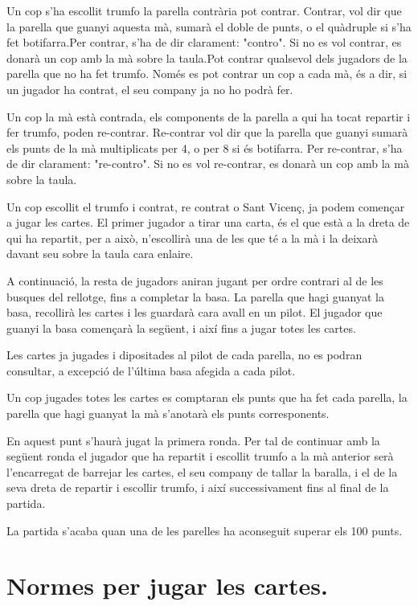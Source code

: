 Un cop s'ha escollit trumfo la parella contrària pot contrar. Contrar, vol dir que la parella que guanyi aquesta mà, sumarà el doble de punts, o el quàdruple si s'ha fet botifarra.Per contrar, s'ha de dir clarament: "contro". Si no es vol contrar, es donarà un cop amb la mà sobre la taula.Pot contrar qualsevol dels jugadors de la parella que no ha fet trumfo. Només es pot contrar un cop a cada mà, és a dir, si un jugador ha contrat, el seu company ja no ho podrà fer.

Un cop la mà està contrada, els components de la parella a qui ha tocat repartir i fer trumfo, poden re-contrar. Re-contrar vol dir que la parella que guanyi sumarà els punts de la mà multiplicats per 4, o per 8 si és botifarra. Per re-contrar, s'ha de dir clarament: "re-contro". Si no es vol re-contrar, es donarà un cop amb la mà sobre la taula.


Un cop escollit el trumfo i contrat, re contrat o Sant Vicenç, ja podem començar a jugar les cartes. El primer jugador a tirar una carta, és el que està a la dreta de qui ha repartit, per a això, n'escollirà una de les que té a la mà i la deixarà davant seu sobre la taula cara enlaire.

A continuació, la resta de jugadors aniran jugant per ordre contrari al de les busques del rellotge, fins a completar la basa. La parella que hagi guanyat la basa, recollirà les cartes i les guardarà cara avall en un pilot. El jugador que guanyi la basa començarà la següent, i així fins a jugar totes les cartes.

Les cartes ja jugades i dipositades al pilot de cada parella, no es podran consultar, a excepció de l'última basa afegida a cada pilot.

Un cop jugades totes les cartes es comptaran els punts que ha fet cada parella, la parella que hagi guanyat la mà s'anotarà els punts corresponents.

En aquest punt s'haurà jugat la primera ronda. Per tal de continuar amb la següent ronda el jugador que ha repartit i escollit trumfo a la mà anterior serà l'encarregat de barrejar les cartes, el seu company de tallar la baralla, i el de la seva dreta de repartir i escollir trumfo, i així successivament fins al final de la partida.

La partida s'acaba quan una de les parelles ha aconseguit superar els 100 punts.

\section{Normes per jugar les cartes.}

